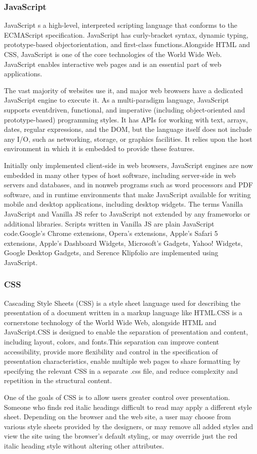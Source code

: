 \subsubsection{JavaScript}
JavaScript s a high-level, interpreted scripting language that conforms to the ECMAScript
specification. JavaScript has curly-bracket syntax, dynamic typing, prototype-based objectorientation,
and first-class functions.Alongside HTML and CSS, JavaScript is one of the core
technologies of the World Wide Web. JavaScript enables interactive web pages and is an essential
part of web applications.\par The vast majority of websites use it, and major web browsers have a
dedicated JavaScript engine to execute it. As a multi-paradigm language, JavaScript supports eventdriven,
functional, and imperative (including object-oriented and prototype-based) programming
styles. It has APIs for working with text, arrays, dates, regular expressions, and the DOM, but the
language itself does not include any I/O, such as networking, storage, or graphics facilities. It relies
upon the host environment in which it is embedded to provide these features.
\par Initially only implemented client-side in web browsers, JavaScript engines are now embedded in
many other types of host software, including server-side in web servers and databases, and in nonweb
programs such as word processors and PDF software, and in runtime environments that make
JavaScript available for writing mobile and desktop applications, including desktop widgets.
The terms Vanilla JavaScript and Vanilla JS refer to JavaScript not extended by any frameworks or
additional libraries. Scripts written in Vanilla JS are plain JavaScript code.Google's Chrome
extensions, Opera's extensions, Apple's Safari 5 extensions, Apple's Dashboard Widgets, Microsoft's
Gadgets, Yahoo! Widgets, Google Desktop Gadgets, and Serence Klipfolio are implemented using
JavaScript.

\subsubsection{CSS}
Cascading Style Sheets (CSS) is a style sheet language used for describing the presentation of a
document written in a markup language like HTML.CSS is a cornerstone technology of the World
Wide Web, alongside HTML and JavaScript.CSS is designed to enable the separation of
presentation and content, including layout, colors, and fonts.This separation can improve content
accessibility, provide more flexibility and control in the specification of presentation characteristics,
enable multiple web pages to share formatting by specifying the relevant CSS in a separate .css file,
and reduce complexity and repetition in the structural content.
\par One of the goals of CSS is to allow users greater control over presentation. Someone who finds red
italic headings difficult to read may apply a different style sheet. Depending on the browser and the
web site, a user may choose from various style sheets provided by the designers, or may remove all
added styles and view the site using the browser's default styling, or may override just the red italic
heading style without altering other attributes.


